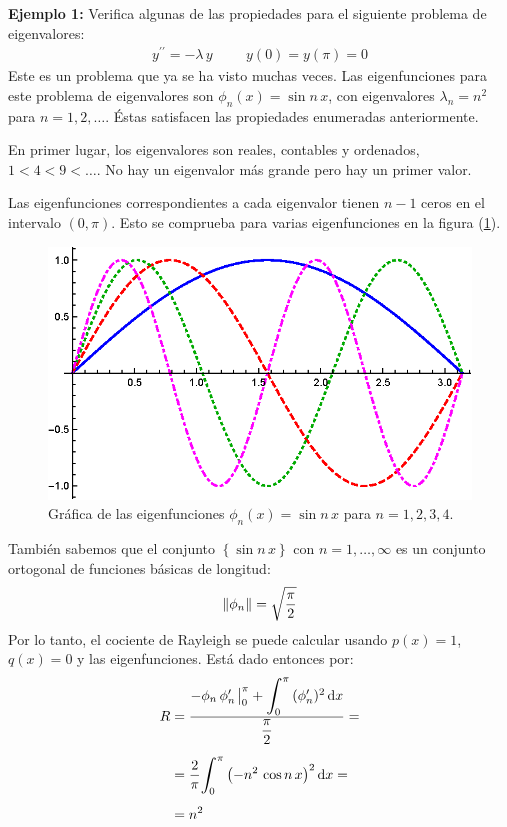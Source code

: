 \documentclass[12pt]{article}
\newcommand{\pderivada}[1]{\ensuremath{{#1}^{\prime}}}
\newcommand{\sderivada}[1]{\ensuremath{{#1}^{\prime \prime}}}
\def\scaleint#1{\vcenter{\hbox{\scaleto[3ex]{\displaystyle\int}{#1}}}}
\def\bs{\mkern-12mu}
\numberwithin{equation}{section}
\begin{document}
\textbf{Ejemplo 1: } Verifica algunas de las propiedades para el siguiente problema de eigenvalores:
\begin{align*}
\sderivada{y} = - \lambda \, y \hspace{1cm} y(0) = y(\pi) = 0
\end{align*}
Este es un problema que ya se ha visto muchas veces. Las eigenfunciones para este problema de eigenvalores son $\phi_{n} (x) = \sin n\, x$, con eigenvalores $\lambda_{n} = n^{2}$ para $n = 1, 2, \ldots$. Éstas satisfacen las propiedades enumeradas anteriormente.
\par
En primer lugar, los eigenvalores son reales, contables y ordenados, $1 < 4 < 9 < \ldots$. No hay un eigenvalor más grande pero hay un primer valor.
\par
Las eigenfunciones correspondientes a cada eigenvalor tienen $n -1$ ceros en el intervalo $(0, \pi)$. Esto se comprueba para varias eigenfunciones en la figura (\ref{fig:figura_04_01}).
\begin{figure}[H]
    \centering
    \includegraphics[scale=1.3]{Imagenes/Eigenfunciones_Sin_nx.eps}
    \caption{Gráfica de las eigenfunciones $\phi_{n} (x) = \sin n \,x$ para $n = 1, 2, 3, 4$.}
    \label{fig:figura_04_01}
\end{figure}
También sabemos que el conjunto $\left\{ \sin n \, x \right\}$ con $n = 1, \ldots, \infty$ es un conjunto ortogonal de funciones básicas de longitud:
\begin{align*}
\norm{\phi_{n}} = \sqrt{\dfrac{\pi}{2}}
\end{align*}
Por lo tanto, el cociente de Rayleigh se puede calcular usando $p (x) = 1$, $q (x) = 0$ y las eigenfunciones. Está dado entonces por:
\begin{align}
\begin{aligned}[b]
R &= \dfrac{- \phi_{n} \, \pderivada{\phi}_{n} \eval_{0}^{\pi} + \scaleint{6ex}_{\bs 0}^{\pi} \, (\pderivada{\phi}_{n})^{2} \dd{x}}{\dfrac{\pi}{2}} = \\[0.5em]
&= \dfrac{2}{\pi} \scaleint{6ex}_{\bs 0}^{\pi} \left( - n^{2} \, \cos n \, x \right)^{2} \dd{x} = \\[0.5em]
&= n^{2}
\end{aligned}
\label{eq:ecuacion_04_13}
\end{align}
\end{document}
